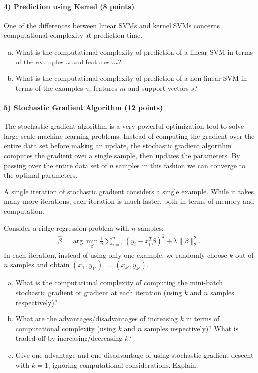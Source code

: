 \documentclass[11pt]{article}
\begin{document}
\paragraph{4) Prediction using Kernel (8 points)} 
One of the differences between linear SVMs and kernel SVMs concerns computational complexity at prediction time.
\begin{enumerate}[(a)]
\item What is the computational complexity of prediction of a linear SVM in terms of the examples $n$ and features $m$?
\item What is the computational complexity of prediction of a non-linear SVM in terms of the examples $n$, features $m$ and support vectors $s$?
\end{enumerate}

\paragraph{5) Stochastic Gradient Algorithm (12 points)}

The stochastic gradient algorithm is a very powerful optimization tool to solve large-scale machine learning problems. Instead of computing the gradient over the entire data set before making an update, the stochastic gradient algorithm computes the gradient over a single sample, then updates the parameters. By passing over the entire data set of $n$ samples in this fashion we can converge to the optimal parameters.

A single iteration of stochastic gradient considers a single example.
While it takes many more iterations, each iteration is much faster, both in terms of memory and computation.

Consider a ridge regression problem with $n$ samples:
\begin{align}
\hat{\beta} = \arg\min_{\beta}\frac{1}{n}\sum_{i=1}^n(y_i - x_i^T\beta)^2 + \lambda\|\beta\|_2^2.
\end{align}
In each iteration, instead of using only one example, we randomly choose $k$ out of $n$ samples and obtain $(x_{1'},y_{1'}),...,(x_{k'},y_{k'})$. 

\begin{enumerate}[(a)]
\item What is the computational complexity of computing the mini-batch stochastic gradient or gradient at each iteration (using $k$ and $n$ samples respectively)?
\item What are the advantages/disadvantages of increasing $k$ in terms of computational complexity (using $k$ and $n$ samples respectively)? What is traded-off by increasing/decreasing $k$?
\item Give one advantage and one disadvantage of using stochastic gradient
descent with $k=1$, ignoring computational considerations.  Explain.
\end{enumerate}
\end{document}
